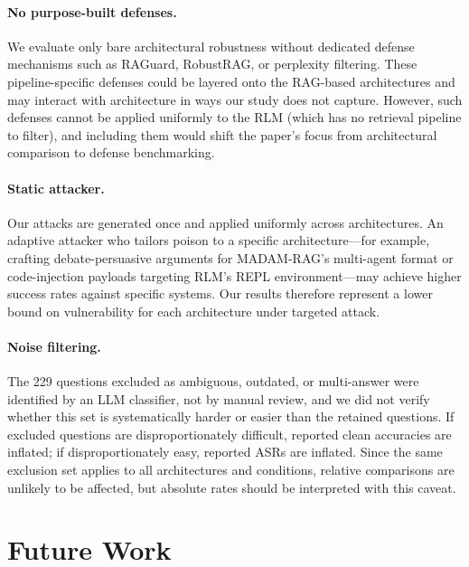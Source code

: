 \documentclass[11pt]{article}
\begin{document}
\paragraph{No purpose-built defenses.} We evaluate only bare architectural robustness without dedicated defense mechanisms such as RAGuard, RobustRAG, or perplexity filtering. These pipeline-specific defenses could be layered onto the RAG-based architectures and may interact with architecture in ways our study does not capture. However, such defenses cannot be applied uniformly to the RLM (which has no retrieval pipeline to filter), and including them would shift the paper's focus from architectural comparison to defense benchmarking.

\paragraph{Static attacker.} Our attacks are generated once and applied uniformly across architectures. An adaptive attacker who tailors poison to a specific architecture---for example, crafting debate-persuasive arguments for MADAM-RAG's multi-agent format or code-injection payloads targeting RLM's REPL environment---may achieve higher success rates against specific systems. Our results therefore represent a lower bound on vulnerability for each architecture under targeted attack.

\paragraph{Noise filtering.} The 229 questions excluded as ambiguous, outdated, or multi-answer were identified by an LLM classifier, not by manual review, and we did not verify whether this set is systematically harder or easier than the retained questions. If excluded questions are disproportionately difficult, reported clean accuracies are inflated; if disproportionately easy, reported ASRs are inflated. Since the same exclusion set applies to all architectures and conditions, relative comparisons are unlikely to be affected, but absolute rates should be interpreted with this caveat.

\section{Future Work}
\label{sec:future_work}
\end{document}
